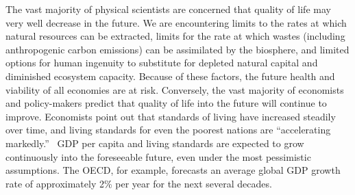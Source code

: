 \label{chap:preface}




The vast majority of physical scientists are concerned that 
quality of life may very well decrease in the future. 
We are encountering 
limits to the rates at which natural resources can be extracted, 
limits for the rate at which wastes (including anthropogenic carbon emissions) 
can be assimilated by the biosphere, and
limited options for human ingenuity to substitute 
for depleted natural capital and diminished ecosystem capacity. 
Because of these factors, 
the future health and viability of all economies are at risk.\cite{IPCC2013} 
Conversely, the vast majority of economists and policy-makers predict 
that quality of life into the future will continue to improve. 
Economists point out that standards of living have increased steadily over time,
and living standards for even the poorest nations 
are ``accelerating markedly.''~\cite{Malik:2013aa} 
GDP per capita and living standards are expected to
grow continuously into the foreseeable future,
even under the most pessimistic assumptions.\cite[p.~170]{Malik:2013aa} 
The OECD, for example, forecasts an average global GDP
growth rate of approximately 2\% per year 
for the next several decades.\cite[Table A.1]{OECD2012}

